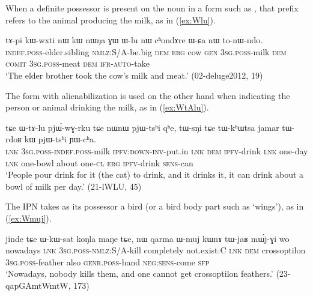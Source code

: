  When a definite possessor is present on the noun  in a form such as , that prefix refers to the animal producing the milk, as in (\ref{ex:Wlu}).
 
 \begin{exe}
\ex \label{ex:Wlu}
 \gll 
tɤ-pi kɯ-wxti nɯ kɯ nɯŋa ɣɯ ɯ-lu nɯ cʰondɤre  ɯ-ɕa nɯ to-nɯ-ndo. \\
\textsc{indef.poss}-elder.sibling \textsc{nmlz}:S/A-be.big \textsc{dem} \textsc{erg} cow \textsc{gen} \textsc{3sg.poss}-milk \textsc{dem} \textsc{comit} \textsc{3sg.poss}-meat \textsc{dem} \textsc{ifr}-\textsc{auto}-take \\
\glt `The elder brother took the cow's milk and meat.' (02-deluge2012, 19)
 \end{exe}

The form  with alienabilization is used on the other hand when indicating the person or animal drinking the milk, as in (\ref{ex:WtAlu}).

  \begin{exe}
\ex \label{ex:WtAlu}
 \gll tɕe ɯ-tɤ-lu pjɯ́-wɣ-rku tɕe nɯnɯ pjɯ-tsʰi qʰe, tɯ-sŋi tɕe tɯ-kʰɯtsa jamar tɯ-rdoʁ kɯ pjɯ-tsʰi ɲɯ-cʰa. \\
\textsc{lnk} \textsc{3sg.poss}-\textsc{indef.poss}-milk \textsc{ipfv}:\textsc{down}-\textsc{inv}-put.in  \textsc{lnk} \textsc{dem} \textsc{ipfv}-drink \textsc{lnk} one-day \textsc{lnk} one-bowl about one-\textsc{cl} \textsc{erg} \textsc{ipfv}-drink \textsc{sens}-can \\
\glt `People pour drink for it (the cat) to drink, and it drinks it, it can drink about a bowl of milk per day.' (21-lWLU, 45)
  \end{exe}

The IPN  takes as its possessor a bird (or a bird body part such as `wings'), as in (\ref{ex:Wmuj}).

    \begin{exe}
\ex \label{ex:Wmuj}
 \gll   jinde tɕe ɯ-kɯ-sat koŋla maŋe tɕe, nɯ qarma ɯ-muj kɯnɤ tɯ-jaʁ mɯ́j-ɣi wo \\
 nowadays \textsc{lnk} \textsc{3sg.poss}-\textsc{nmlz}:S/A-kill completely not.exist:C \textsc{lnk} \textsc{dem} crossoptilon \textsc{3sg.poss}-feather also \textsc{genr.poss}-hand \textsc{neg}:\textsc{sens}-come \textsc{sfp} \\
 \glt `Nowadays, nobody kills them, and one cannot get crossoptilon feathers.' (23-qapGAmtWmtW, 173)
  \end{exe}

